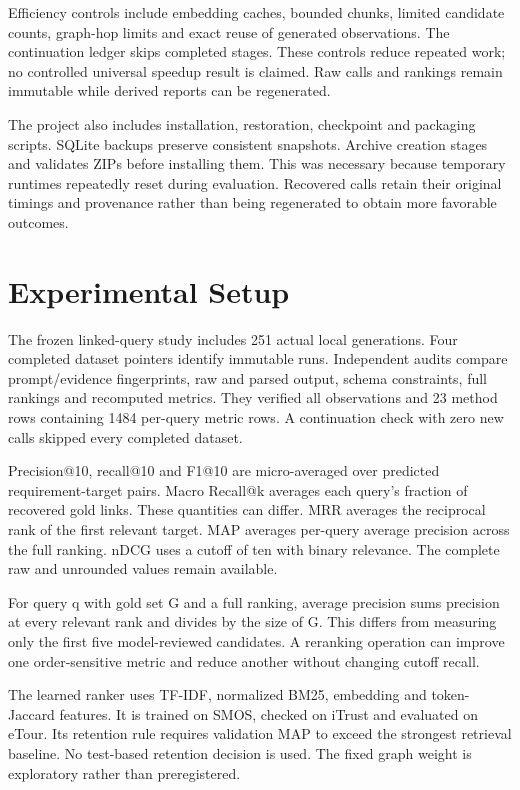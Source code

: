 \documentclass[
  11pt,
  a4paper,
]{report}
\begin{document}
Efficiency controls include embedding caches, bounded chunks, limited
candidate counts, graph-hop limits and exact reuse of generated
observations. The continuation ledger skips completed stages. These
controls reduce repeated work; no controlled universal speedup result is
claimed. Raw calls and rankings remain immutable while derived reports
can be regenerated.

The project also includes installation, restoration, checkpoint and
packaging scripts. SQLite backups preserve consistent snapshots. Archive
creation stages and validates ZIPs before installing them. This was
necessary because temporary runtimes repeatedly reset during evaluation.
Recovered calls retain their original timings and provenance rather than
being regenerated to obtain more favorable outcomes.

\hypertarget{experimental-setup}{%
\chapter{Experimental Setup}\label{experimental-setup}}

The frozen linked-query study includes 251 actual local generations.
Four completed dataset pointers identify immutable runs. Independent
audits compare prompt/evidence fingerprints, raw and parsed output,
schema constraints, full rankings and recomputed metrics. They verified
all observations and 23 method rows containing 1484 per-query metric
rows. A continuation check with zero new calls skipped every completed
dataset.

Precision@10, recall@10 and F1@10 are micro-averaged over predicted
requirement-target pairs. Macro Recall@k averages each query's fraction
of recovered gold links. These quantities can differ. MRR averages the
reciprocal rank of the first relevant target. MAP averages per-query
average precision across the full ranking. nDCG uses a cutoff of ten
with binary relevance. The complete raw and unrounded values remain
available.

For query q with gold set G and a full ranking, average precision sums
precision at every relevant rank and divides by the size of G. This
differs from measuring only the first five model-reviewed candidates. A
reranking operation can improve one order-sensitive metric and reduce
another without changing cutoff recall.

The learned ranker uses TF-IDF, normalized BM25, embedding and
token-Jaccard features. It is trained on SMOS, checked on iTrust and
evaluated on eTour. Its retention rule requires validation MAP to exceed
the strongest retrieval baseline. No test-based retention decision is
used. The fixed graph weight is exploratory rather than preregistered.
\end{document}
